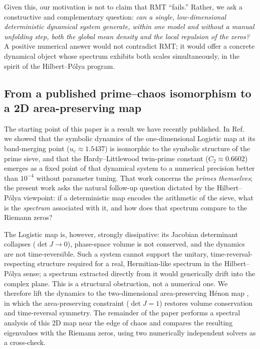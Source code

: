 \documentclass[11pt]{article}
\begin{document}
Given this, our motivation is not to claim that RMT ``fails.'' Rather, we ask a constructive and complementary question: \emph{can a single, low-dimensional deterministic dynamical system generate, within one model and without a manual unfolding step, both the global mean density and the local repulsion of the zeros?} A positive numerical answer would not contradict RMT; it would offer a concrete dynamical object whose spectrum exhibits both scales simultaneously, in the spirit of the Hilbert--P\'olya program.

\subsection{From a published prime--chaos isomorphism to a 2D area-preserving map}

The starting point of this paper is a result we have recently published. In Ref.~\cite{wang2026} we showed that the symbolic dynamics of the one-dimensional Logistic map at its band-merging point ($u_c \approx 1.5437$) is isomorphic to the symbolic structure of the prime sieve, and that the Hardy--Littlewood twin-prime constant ($C_2 \approx 0.6602$) emerges as a fixed point of that dynamical system to a numerical precision better than $10^{-4}$ without parameter tuning. That work concerns the \emph{primes themselves}; the present work asks the natural follow-up question dictated by the Hilbert--P\'olya viewpoint: if a deterministic map encodes the arithmetic of the sieve, what is the \emph{spectrum} associated with it, and how does that spectrum compare to the Riemann zeros?

The Logistic map is, however, strongly dissipative: its Jacobian determinant collapses ($\det J \to 0$), phase-space volume is not conserved, and the dynamics are not time-reversible. Such a system cannot support the unitary, time-reversal-respecting structure required for a real, Hermitian-like spectrum in the Hilbert--P\'olya sense; a spectrum extracted directly from it would generically drift into the complex plane. This is a structural obstruction, not a numerical one. We therefore lift the dynamics to the two-dimensional area-preserving H\'enon map \cite{henon1969}, in which the area-preserving constraint ($\det J = 1$) restores volume conservation and time-reversal symmetry. The remainder of the paper performs a spectral analysis of this 2D map near the edge of chaos and compares the resulting eigenvalues with the Riemann zeros, using two numerically independent solvers as a cross-check.
\end{document}

